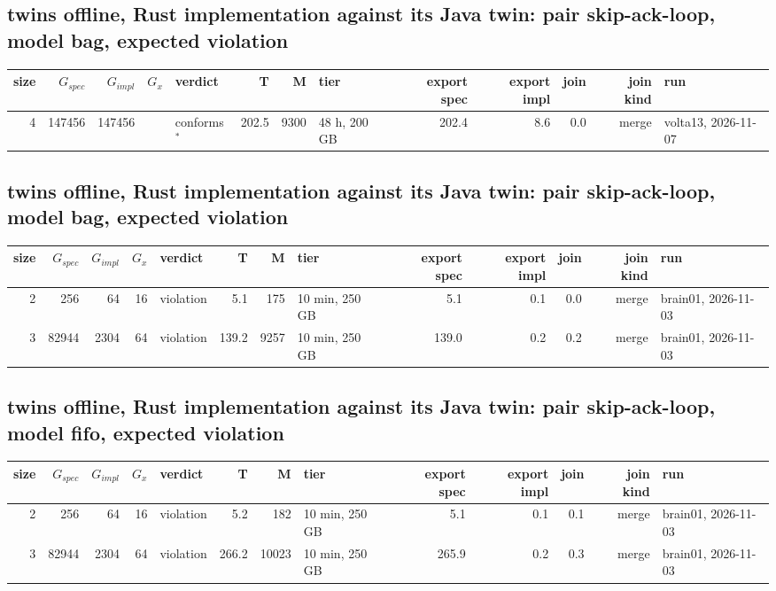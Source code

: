\documentclass[10pt]{article}
\begin{document}
\subsection*{twins offline, Rust implementation against its Java twin: pair \textsf{skip-ack-loop}, model bag, expected violation}
\begin{longtable}{@{}rrrrlrrlrrrrl@{}}
\toprule
size & $G_{\mathit{spec}}$ & $G_{\mathit{impl}}$ & $G_x$ & verdict & T & M & tier & export spec & export impl & join & join kind & run \\
\midrule
\endhead
\color{red} 4 & 147456 & 147456 &  & conforms$^{\ast}$ & 202.5 & 9300 & 48 h, 200 GB & 202.4 & 8.6 & 0.0 & merge & volta13, 2026-11-07 \\
\bottomrule
\end{longtable}
\subsection*{twins offline, Rust implementation against its Java twin: pair \textsf{skip-ack-loop}, model bag, expected violation}
\begin{longtable}{@{}rrrrlrrlrrrrl@{}}
\toprule
size & $G_{\mathit{spec}}$ & $G_{\mathit{impl}}$ & $G_x$ & verdict & T & M & tier & export spec & export impl & join & join kind & run \\
\midrule
\endhead
\color{blue} 2 & 256 & 64 & 16 & violation & 5.1 & 175 & 10 min, 250 GB & 5.1 & 0.1 & 0.0 & merge & brain01, 2026-11-03 \\
\color{blue} 3 & 82944 & 2304 & 64 & violation & 139.2 & 9257 & 10 min, 250 GB & 139.0 & 0.2 & 0.2 & merge & brain01, 2026-11-03 \\
\bottomrule
\end{longtable}
\subsection*{twins offline, Rust implementation against its Java twin: pair \textsf{skip-ack-loop}, model fifo, expected violation}
\begin{longtable}{@{}rrrrlrrlrrrrl@{}}
\toprule
size & $G_{\mathit{spec}}$ & $G_{\mathit{impl}}$ & $G_x$ & verdict & T & M & tier & export spec & export impl & join & join kind & run \\
\midrule
\endhead
\color{blue} 2 & 256 & 64 & 16 & violation & 5.2 & 182 & 10 min, 250 GB & 5.1 & 0.1 & 0.1 & merge & brain01, 2026-11-03 \\
\color{blue} 3 & 82944 & 2304 & 64 & violation & 266.2 & 10023 & 10 min, 250 GB & 265.9 & 0.2 & 0.3 & merge & brain01, 2026-11-03 \\
\bottomrule
\end{longtable}
\end{document}
